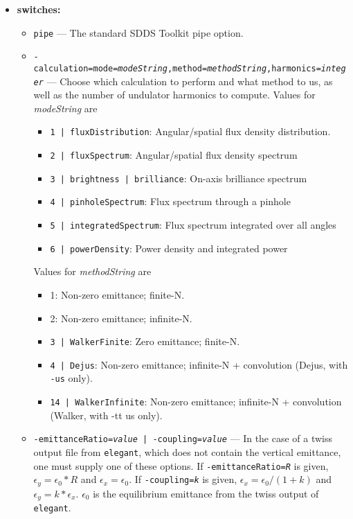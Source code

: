 \documentclass[11pt]{article}
\begin{document}
\begin{itemize}
\item {\bf switches:}
\begin{itemize}
\item {\tt pipe} --- The standard SDDS Toolkit pipe option.
\item {\tt -calculation=mode={\em modeString},method={\em methodString},harmonics={\em integer}} ---
 Choose which calculation to perform and what method to us, as well as the number of undulator harmonics to
  compute.  Values for {\em modeString} are
  \begin{itemize}
    \item {\tt 1 | fluxDistribution}:        Angular/spatial flux density distribution.
    \item {\tt 2 | fluxSpectrum}:            Angular/spatial flux density spectrum
    \item {\tt 3 | brightness | brilliance}: On-axis brilliance spectrum
    \item {\tt 4 | pinholeSpectrum}:         Flux spectrum through a pinhole
    \item {\tt 5 | integratedSpectrum}:      Flux spectrum integrated over all angles
    \item {\tt 6 | powerDensity}:            Power density and integrated power
  \end{itemize}
  Values for {\em methodString} are
  \begin{itemize}
    \item 1:                    Non-zero emittance; finite-N.
    \item 2:                    Non-zero emittance; infinite-N.
    \item {\tt 3 | WalkerFinite}:   Zero emittance;     finite-N.
    \item {\tt 4  | Dejus}:           Non-zero emittance; infinite-N + convolution (Dejus, with {\tt -us} only).
    \item {\tt 14 | WalkerInfinite}:    Non-zero emittance; infinite-N + convolution (Walker, with {-tt us} only).
  \end{itemize}
\item {\tt -emittanceRatio={\em value} | -coupling={\em value}} --- In the case of a twiss
 output file from {\tt elegant}, which does not contain the vertical emittance, one must
 supply one of these options.  If {\tt -emittanceRatio={\em R}} is given, $\epsilon_y = \epsilon_0*R$ 
 and $\epsilon_x = \epsilon_0$. If {\tt -coupling={\em k}} is given, $\epsilon_x = \epsilon_0/(1+k)$
 and $\epsilon_y = k*\epsilon_x$.  $\epsilon_0$ is the equilibrium emittance from the twiss output
 of {\tt elegant}.  


\end{itemize}
\end{itemize}
\end{document}
